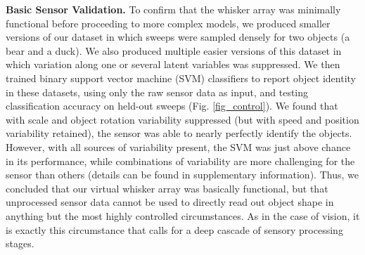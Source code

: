 \textbf{Basic Sensor Validation.} To confirm that the whisker array was minimally functional before proceeding to more complex models, we produced smaller versions of our dataset in which sweeps were sampled densely for two objects (a bear and a duck).  
We also produced multiple easier versions of this dataset in which variation along one or several latent variables was suppressed. 
We then trained binary support vector machine (SVM) classifiers to report object identity in these datasets, using only the raw sensor data as input, and testing classification accuracy on held-out sweeps (Fig. \ref{fig_control}).  We found that with scale and object rotation variability suppressed (but with speed and position variability retained), the sensor was able to nearly perfectly identify the objects.  
However, with all sources of variability present, the SVM was just above chance in its performance,  
while combinations of variability are more challenging for the sensor than others (details can be found in supplementary information). 
Thus, we concluded that our virtual whisker array was basically functional, but that unprocessed sensor data cannot be used to directly read out object shape in anything but the most highly controlled circumstances.
As in the case of vision, it is exactly this circumstance that calls for a deep cascade of sensory processing stages. 

